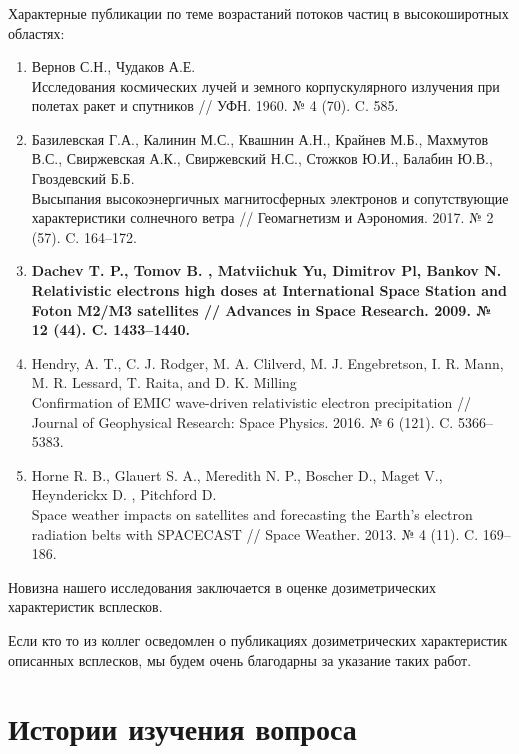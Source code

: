 \documentclass[t, aspectratio=43]{beamer}
\begin{document}
\begin{frame}	
\frametitle{\insertsection} 
{\tiny 
Характерные публикации по теме возрастаний потоков частиц в
высокоширотных областях:

\begin{enumerate}
	\item
	Вернов С.Н., Чудаков А.Е. \\ Исследования космических лучей и земного корпускулярного излучения при полетах ракет и спутников // УФН. 1960. № 4 (70). C. 585.
	\item
	Базилевская Г.А., Калинин М.С., Квашнин А.Н., Крайнев М.Б., Махмутов В.С., Свиржевская А.К., Свиржевский Н.С., Стожков Ю.И., Балабин Ю.В., Гвоздевский Б.Б. \\ Высыпания высокоэнергичных магнитосферных электронов и сопутствующие характеристики солнечного ветра // Геомагнетизм и Аэрономия. 2017. № 2 (57). C. 164–172.	
	\item
	\textbf{Dachev T. P., 	Tomov B. ,	Matviichuk Yu,	Dimitrov Pl, Bankov N.\\ Relativistic electrons high doses at International Space Station and Foton M2/M3 satellites // Advances in Space Research. 2009. № 12 (44). C. 1433–1440.}
	\item
	Hendry, A. T., C. J. Rodger, M. A. Clilverd, M. J. Engebretson, I. R. Mann, M. R. Lessard, T. Raita, and D. K. Milling \\ Confirmation of EMIC wave-driven relativistic electron precipitation // Journal of Geophysical Research: Space Physics. 2016. № 6 (121). C. 5366–5383.
	\item Horne R. B.,  Glauert S. A., 	Meredith N. P., 	Boscher D., 	Maget V., Heynderickx D. ,	Pitchford D. \\ Space weather impacts on satellites and forecasting the Earth’s electron radiation belts with SPACECAST // Space Weather. 2013. № 4 (11). C. 169–186.
\end{enumerate}
}
{\tiny 


Новизна нашего исследования заключается в оценке дозиметрических характеристик всплесков.

Если кто то из коллег осведомлен о публикациях дозиметрических характеристик описанных всплесков, мы будем очень благодарны за указание таких работ.
}



\end{frame}

\section{Истории изучения вопроса}
\end{document}
